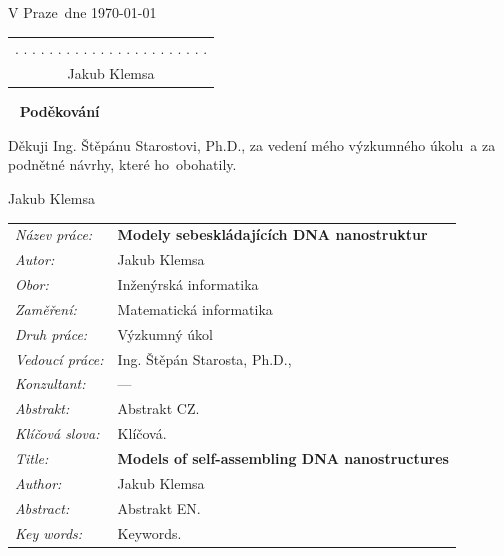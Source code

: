 \documentclass[a4paper, 11pt]{report}
\theoremstyle{definition}
\let\haluz\relax
\newcommand{\obor}{Inženýrská informatika}
\newcommand{\minf}{Matematická informatika}
\newcommand{\TypPrace}{Výzkumný úkol}
\newcommand{\mePrace}{mého výzkumného úkolu}
\newcommand{\rodPrace}{ho}
\newcommand{\nazevcz}{Modely sebeskládajících DNA nanostruktur}
\newcommand{\nazeven}{Models of self-assembling DNA nanostructures}
\newcommand{\autor}{Jakub Klemsa}
\newcommand{\vedouci}{Ing. Štěpán Starosta, Ph.D.}
\newcommand{\vedoucimu}{Ing. Štěpánu Starostovi, Ph.D.}
\newcommand{\pracovisteVed}{}
\newcommand{\konzultant}{---}
\newcommand{\vMiste}{Praze}
\newcommand{\klicova}{Klíčová.}
\newcommand{\keyword}{Keywords.}
\newcommand{\abstrCZ}{Abstrakt CZ.}
\newcommand{\abstrEN}{Abstrakt EN.}
\begin{document}
\begin{titlepage}
\noindent
\vspace{5mm}V \vMiste ~dne \today\hfill
	\begin{tabular}{c}
	. . . . . . . . . . . . . . . . . . . . . . .\\
	\autor
	\end{tabular}
\newpage


\thispagestyle{empty}
~
\vfill
\noindent\textbf{Poděkování}
\vspace{0.5cm}

\noindent
Děkuji \vedoucimu, za vedení \mePrace ~a za podnětné návrhy, které \rodPrace ~obohatily.

\begin{flushright}
\autor
\end{flushright}
\newpage


\thispagestyle{empty}

\begin{tabularx}{\textwidth}{lX}
  {\em Název práce:} & \bf \nazevcz \\[4mm]
  {\em Autor:} & \autor \\[4mm]
  {\em Obor:} & \obor \\[4mm]
  {\em Zaměření:} & \minf \\[4mm]
  {\em Druh práce:} & \TypPrace \\[4mm]
  {\em Vedoucí práce:} & \vedouci, \pracovisteVed \\[4mm]
  {\em Konzultant:} & \konzultant \\[4mm]
  {\em Abstrakt:} & \abstrCZ \\[4mm]
  {\em Klíčová slova:} & \klicova \\[20mm]

  {\em Title:} & \bf \nazeven \\[4mm]
  {\em Author:} & \autor \\[4mm]
  {\em Abstract:} & \abstrEN \\[4mm]
  {\em Key words:} & \keyword
\end{tabularx}
\newpage


\thispagestyle{empty}
\printnomenclature
\newpage


\tableofcontents
\thispagestyle{empty}

\end{titlepage}


\end{document}
